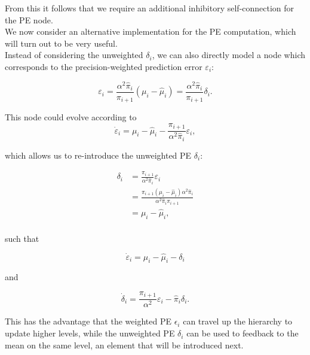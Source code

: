 From this it follows that we require an additional inhibitory self-connection for the \textsf{PE} node.\\

We now consider an alternative implementation for the \textsf{PE} computation, which will turn out to be very useful.\\

Instead of considering the unweighted $\delta_i$, we can also directly model a node which corresponds to the precision-weighted prediction error $\varepsilon_i$:

\begin{equation}
	\varepsilon_i = \frac{\alpha^2 \hat{\pi}_i}{\pi_{i+1}} (\mu_i - \hat{\mu}_i) = \frac{\alpha^2 \hat{\pi}_i}{\pi_{i+1}} \delta_i.
\end{equation}

This node could evolve according to
\begin{equation}
	\dot{\varepsilon}_i = \mu_i - \hat{\mu}_i -  \frac{\pi_{i+1}}{\alpha^2 \hat{\pi}_i} \varepsilon_i,
\end{equation}

which allows us to re-introduce the unweighted \textsf{PE} $\delta_i$:

\begin{equation}
	\begin{split}
		\delta_i &= \frac{\pi_{i+1}}{\alpha^2 \hat{\pi}_i} \varepsilon_i \\
		&= \frac{\pi_{i+1} (\mu_i - \hat{\mu}_i) \alpha^2 \hat{\pi}_i}{\alpha^2 \hat{\pi}_i \pi_{i+1}}\\
		&= \mu_i - \hat{\mu}_i,\\
	\end{split}
\end{equation}

such that

\begin{equation}
	\dot{\varepsilon}_i = \mu_i - \hat{\mu}_i - \delta_i
\end{equation}

and

\begin{equation}
	\dot{\delta}_i = \frac{\pi_{i+1}}{\alpha^2} \varepsilon_i - \hat{\pi}_i \delta_i.
\end{equation}

This has the advantage that the weighted \textsf{PE} $\epsilon_i$ can travel up the hierarchy to update higher levels, while the unweighted \textsf{PE} $\delta_i$ can be used to feedback to the mean on the same level, an element that will be introduced next.\\ 


